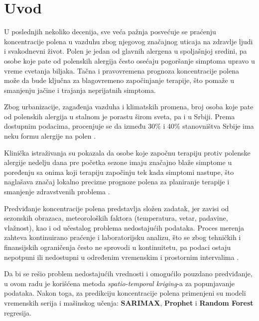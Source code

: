 \documentclass[12pt]{article}
\begin{document}
\mbox{}
\newpage
\thispagestyle{empty}
\tableofcontents
\thispagestyle{empty}
\mbox{}
\newpage

\section{Uvod}
\setcounter{page}{1}
\hspace*{\parindent}
U poslednjih nekoliko decenija, sve veća pažnja posvećuje se praćenju koncentracije polena u vazduhu zbog njegovog značajnog uticaja na zdravlje ljudi i svakodnevni život. Polen je jedan od glavnih alergena u spoljašnjoj sredini, pa osobe koje pate od polenskih alergija često osećaju pogoršanje simptoma upravo u vreme cvetanja biljaka. Tačna i pravovremena prognoza koncentracije polena može da bude ključna za blagovremeno započinjanje terapije, što pomaže u smanjenju jačine i trajanja neprijatnih simptoma.

Zbog urbanizacije, zagađenja vazduha i klimatskih promena, broj osoba koje pate od polenskih alergija u stalnom je porastu širom sveta, pa i u Srbiji. Prema dostupnim podacima, procenjuje se da između 30\% i 40\% stanovništva Srbije ima neku formu alergije na polen \cite{bionette2023, drugacijipristup2025}.

Klinička istraživanja su pokazala da osobe koje započnu terapiju protiv polenske alergije nedelju dana pre početka sezone imaju značajno blaže simptome u poređenju sa onima koji terapiju započinju tek kada simptomi nastupe, što naglašava značaj lokalno precizne prognoze polena za planiranje terapije i smanjenje zdravstvenih problema \cite{omalizumab2022, birch2019}.

Predviđanje koncentracije polena predstavlja složen zadatak, jer zavisi od sezonskih obrazaca, meteoroloških faktora (temperatura, vetar, padavine, vlažnost), kao i od učestalog problema nedostajućih podataka. Proces merenja zahteva kontinuirano praćenje i laboratorijsku analizu, što se zbog tehničkih i finansijskih ograničenja često ne sprovodi u kontinuitetu, pa podaci ostaju nepotpuni ili nedostupni u određenim vremenskim i prostornim intervalima \cite{minic2020, sofia2023}.

Da bi se rešio problem nedostajućih vrednosti i omogućilo pouzdano predviđanje, u ovom radu je korišćena metoda \textit{spatio-temporal kriging}-a za popunjavanje podataka. Nakon toga, za predikciju koncentracije polena primenjeni su modeli vremenskih serija i mašinskog učenja: \textbf{SARIMAX}, \textbf{Prophet} i \textbf{Random Forest} regresija.
\end{document}
